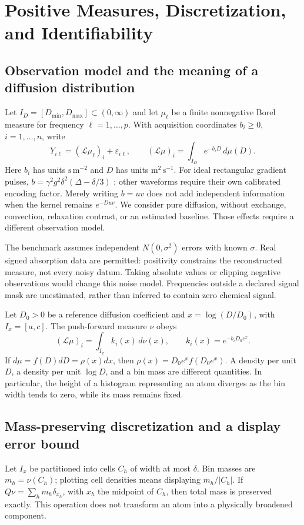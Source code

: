 \section{Positive Measures, Discretization, and Identifiability}\label{sec:theory}
\subsection{Observation model and the meaning of a diffusion distribution}
Let $I_D=[D_{\min},D_{\max}]\subset(0,\infty)$ and let $\mu_\ell$ be a finite nonnegative Borel measure for frequency $\ell=1,\ldots,p$. With acquisition coordinates $b_i\geq0$, $i=1,\ldots,n$, write
\begin{equation}\label{eq:measure}
 Y_{i\ell}=(\mathcal L\mu_\ell)_i+\varepsilon_{i\ell},\qquad
 (\mathcal L\mu)_i=\int_{I_D}e^{-b_iD}\,d\mu(D).
\end{equation}
Here $b_i$ has units $\mathrm{s\,m^{-2}}$ and $D$ has units $\mathrm{m^2\,s^{-1}}$. For ideal rectangular gradient pulses, $b=\gamma^2g^2\delta^2(\Delta-\delta/3)$ \cite{stejskal}; other waveforms require their own calibrated encoding factor. Merely writing $b=uv$ does not add independent information when the kernel remains $e^{-Duv}$. We consider pure diffusion, without exchange, convection, relaxation contrast, or an estimated baseline. Those effects require a different observation model.

The benchmark assumes independent $N(0,\sigma^2)$ errors with known $\sigma$. Real signed absorption data are permitted: positivity constrains the reconstructed measure, not every noisy datum. Taking absolute values or clipping negative observations would change this noise model. Frequencies outside a declared signal mask are unestimated, rather than inferred to contain zero chemical signal.

Let $D_0>0$ be a reference diffusion coefficient and $x=\log(D/D_0)$, with $I_x=[a,c]$. The push-forward measure $\nu$ obeys
\begin{equation}\label{eq:log}
 (\mathcal L\mu)_i=\int_{I_x} k_i(x)\,d\nu(x),\qquad
 k_i(x)=e^{-b_iD_0e^x}.
\end{equation}
If $d\mu=f(D)dD=\rho(x)dx$, then $\rho(x)=D_0e^x f(D_0e^x)$. A density per unit $D$, a density per unit $\log D$, and a bin mass are different quantities. In particular, the height of a histogram representing an atom diverges as the bin width tends to zero, while its mass remains fixed.

\subsection{Mass-preserving discretization and a display error bound}
Let $I_x$ be partitioned into cells $C_h$ of width at most $\delta$. Bin masses are $m_h=\nu(C_h)$; plotting cell densities means displaying $m_h/|C_h|$. If $Q\nu=\sum_h m_h\delta_{x_h}$, with $x_h$ the midpoint of $C_h$, then total mass is preserved exactly. This operation does not transform an atom into a physically broadened component.

